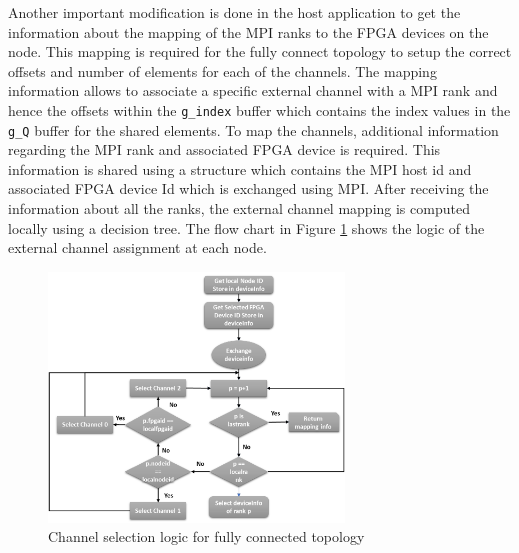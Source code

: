 Another important modification is done in the host application to get the information about
the mapping of the MPI ranks to the FPGA devices on the node. This mapping is required for the
fully connect topology to setup the correct offsets and number of elements for each of the channels.
The mapping information allows to associate a specific external channel with a MPI rank and hence the
offsets within the \texttt{g\_index} buffer which contains the index values in the \texttt{g\_Q}
buffer for the shared elements. To map the channels, additional information
regarding the MPI rank and associated FPGA device is required. This information is shared using
a structure which contains the MPI host id and associated FPGA device Id which is exchanged
using MPI. After receiving the information about all the ranks, the external channel mapping
is computed locally using a decision tree. The flow chart in Figure \ref{fig:channel_select}
shows the logic of the external channel assignment at each node.
\begin{figure}[ht]%
    \centering
    \includegraphics[width=0.7\textwidth]{images/channel_select}
    \caption{Channel selection logic for fully connected topology}
    \label{fig:channel_select}
\end{figure}


